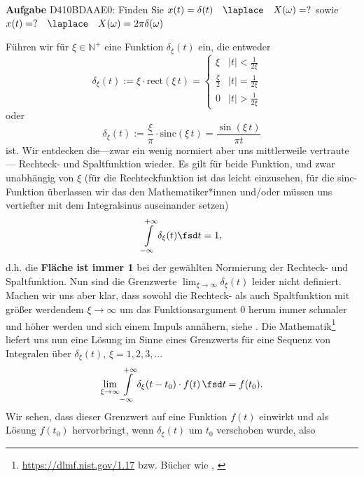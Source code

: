 \textbf{Aufgabe} {\tiny D410BDAAE0}:
Finden Sie $x(t)=\delta(t)\quad \laplace \quad X(\omega)=?$ sowie
$x(t)= ? \quad \laplace \quad X(\omega)=2\pi \delta(\omega)$
\begin{Werkzeug}
Führen wir für $\xi\in\mathbb{N}^+$ eine Funktion $\delta_\xi(t)$ ein, die entweder
\begin{equation}
\delta_\xi(t) := \xi \cdot \mathrm{rect}(\xi \, t) =
\begin{cases} \xi & |t| < \frac{1}{2 \xi} \\ \frac{\xi}{2} & |t| = \frac{1}{2 \xi} \\ 0 & |t| > \frac{1}{2 \xi} \end{cases}\quad
\end{equation}
oder
\begin{equation}
\delta_\xi(t) := \frac{\xi}{\pi} \cdot \mathrm{sinc}(\xi \, t) = \frac{\sin(\xi \, t)}{\pi t}
\end{equation}
ist.
Wir entdecken die---zwar ein wenig normiert aber uns mittlerweile vertraute---
Rechteck- und Spaltfunktion wieder.
%
Es gilt für beide Funktion, und zwar unabhängig von $\xi$ (für die
Rechteckfunktion ist das leicht einzusehen, für die sinc-Funktion überlassen wir
das den Mathematiker*innen und/oder müssen uns vertiefter mit dem Integralsinus
auseinander setzen)
\begin{equation}
\int\limits_{-\infty}^{+\infty} \delta_\xi(t) \fsd t = 1,
\end{equation}
d.h. die \textbf{Fläche ist immer 1} bei der gewählten Normierung der
Rechteck- und Spaltfunktion.
%
Nun sind die Grenzwerte
$\lim_{\xi\to\infty} \delta_\xi(t)$
leider nicht definiert.
%
Machen wir uns aber klar, dass sowohl die Rechteck- als auch Spaltfunktion mit
größer werdendem $\xi\to \infty$ um das Funktionsargument $0$ herum
immer schmaler und höher werden und sich
einem Impuls annähern, siehe .
%
Die Mathematik\footnote{\url{https://dlmf.nist.gov/1.17} bzw. Bücher wie
\cite[Kapitel 1.15]{Arfken2005}, \cite{Burg2013}}
liefert uns nun eine Lösung im Sinne eines Grenzwerts für eine
Sequenz von Integralen über $\delta_\xi(t)$, $\xi=1,2,3,...$
\begin{equation}
\lim_{\xi\to\infty} \int\limits_{-\infty}^{+\infty}
\delta_\xi(t-t_0) \cdot f(t) \, \fsd t = f(t_0).
\end{equation}
Wir sehen, dass dieser Grenzwert auf eine Funktion $f(t)$ einwirkt und als Lösung
$f(t_0)$ hervorbringt, wenn $\delta_\xi(t)$ um $t_0$ verschoben wurde, also

\end{Werkzeug}
